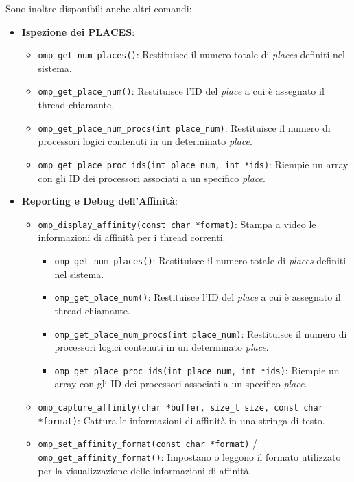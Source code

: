 Sono inoltre disponibili anche altri comandi:
\begin{itemize}
    \item \textbf{Ispezione dei PLACES}:
    \begin{itemize}
        \item \texttt{omp\_get\_num\_places()}: Restituisce il numero totale di \textit{places} definiti nel sistema.
        \item \texttt{omp\_get\_place\_num()}: Restituisce l'ID del \textit{place} a cui è assegnato il thread chiamante.
        \item \texttt{omp\_get\_place\_num\_procs(int place\_num)}: Restituisce il numero di processori logici contenuti in un determinato \textit{place}.
        \item \texttt{omp\_get\_place\_proc\_ids(int place\_num, int *ids)}: Riempie un array con gli ID dei processori associati a un specifico \textit{place}.
    \end{itemize}
    \item \textbf{Reporting e Debug dell'Affinità}:
    \begin{itemize}
        \item \texttt{omp\_display\_affinity(const char *format)}: Stampa a video le informazioni di affinità per i thread correnti.    \begin{itemize}
        \item \texttt{omp\_get\_num\_places()}: Restituisce il numero totale di \textit{places} definiti nel sistema.
        \item \texttt{omp\_get\_place\_num()}: Restituisce l'ID del \textit{place} a cui è assegnato il thread chiamante.
        \item \texttt{omp\_get\_place\_num\_procs(int place\_num)}: Restituisce il numero di processori logici contenuti in un determinato \textit{place}.
        \item \texttt{omp\_get\_place\_proc\_ids(int place\_num, int *ids)}: Riempie un array con gli ID dei processori associati a un specifico \textit{place}.
    \end{itemize}
        \item \texttt{omp\_capture\_affinity(char *buffer, size\_t size, const char *format)}: Cattura le informazioni di affinità in una stringa di testo.
        \item \texttt{omp\_set\_affinity\_format(const char *format)} / \texttt{omp\_get\_affinity\_format()}: Impostano o leggono il formato utilizzato per la visualizzazione delle informazioni di affinità.
    \end{itemize}
\end{itemize}

